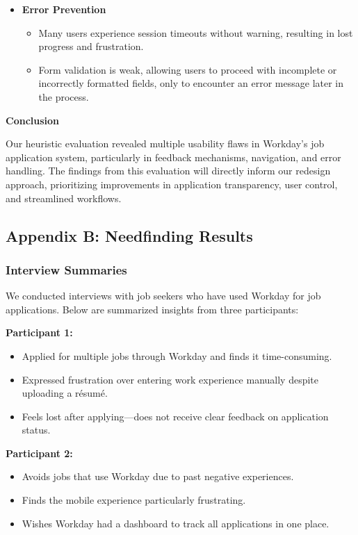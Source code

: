 \documentclass[
	letterpaper, %
]{jdf}
\begin{document}
\begin{sloppypar}
\begin{itemize}
    \item \textbf{Error Prevention}  
    \begin{itemize}
        \item Many users experience session timeouts without warning, resulting in lost progress and frustration.
        \item Form validation is weak, allowing users to proceed with incomplete or incorrectly formatted fields, only to encounter an error message later in the process.
    \end{itemize}
\end{itemize}

\textbf{Conclusion}  

Our heuristic evaluation revealed multiple usability flaws in Workday’s job application system, particularly in feedback mechanisms, navigation, and error handling. The findings from this evaluation will directly inform our redesign approach, prioritizing improvements in application transparency, user control, and streamlined workflows.

\newpage

\subsection{Appendix B: Needfinding Results}

\subsubsection*{Interview Summaries}  

We conducted interviews with job seekers who have used Workday for job applications. Below are summarized insights from three participants:  

\textbf{Participant 1:}  
\begin{itemize}  
    \item Applied for multiple jobs through Workday and finds it time-consuming.  
    \item Expressed frustration over entering work experience manually despite uploading a résumé.  
    \item Feels lost after applying—does not receive clear feedback on application status.  
\end{itemize}  

\textbf{Participant 2:}  
\begin{itemize}  
    \item Avoids jobs that use Workday due to past negative experiences.  
    \item Finds the mobile experience particularly frustrating.  
    \item Wishes Workday had a dashboard to track all applications in one place.  
\end{itemize}  


\end{sloppypar}
\end{document}
